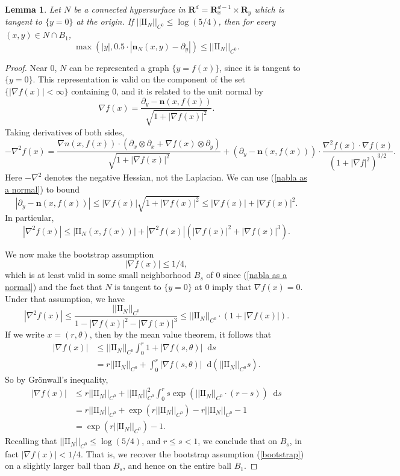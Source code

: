 \documentclass[reqno,11pt]{amsart}
\newcommand{\RR}{\mathbf{R}}
\newcommand*\dif{\mathop{}\!\mathrm{d}}
\newcommand{\Two}{\mathrm{I\!I}}
\newcommand{\normal}{\mathbf n}
\newtheorem{lemma}[theorem]{Lemma}
\theoremstyle{definition}
\numberwithin{equation}{section}
\begin{document}
\begin{lemma}\label{existence of tubes}
	Let $N$ be a connected hypersurface in $\RR^d = \RR^{d - 1}_x \times \RR_y$ which is tangent to $\{y = 0\}$ at the origin.
	If $||\Two_N||_{C^0} \leq \log(5/4)$, then for every $(x, y) \in N \cap B_1$,
	$$\max(|y|, 0.5 \cdot |\normal_N(x, y) - \partial_y|) \leq ||\Two_N||_{C^0}.$$
\end{lemma}
\begin{proof}
	Near $0$, $N$ can be represented a graph $\{y = f(x)\}$, since it is tangent to $\{y = 0\}$.
	This representation is valid on the component of the set $\{|\nabla f(x)| < \infty\}$ containing $0$, and it is related to the unit normal by
\begin{equation}\label{nabla as a normal}
	\nabla f(x) = \frac{\partial_y - \normal(x, f(x))}{\sqrt{1 + |\nabla f(x)|^2}}.
\end{equation}
	Taking derivatives of both sides,
	$$-\nabla^2 f(x) = \frac{\nabla n(x, f(x)) \cdot (\partial_x \otimes \partial_x + \nabla f(x) \otimes \partial_y)}{\sqrt{1 + |\nabla f(x)|^2}} + (\partial_y - \normal(x, f(x))) \cdot \frac{\nabla^2 f(x) \cdot \nabla f(x)}{(1 + |\nabla f|^2)^{3/2}}.$$
	Here $-\nabla^2$ denotes the negative Hessian, not the Laplacian.
	We can use (\ref{nabla as a normal}) to bound
	$$|\partial_y - \normal(x, f(x))| \leq |\nabla f(x)|\sqrt{1 + |\nabla f(x)|^2} \leq |\nabla f(x)| + |\nabla f(x)|^2.$$
	In particular,
	$$|\nabla^2 f(x)| \leq |\Two_N(x, f(x))| + |\nabla^2 f(x)| (|\nabla f(x)|^2 + |\nabla f(x)|^3).$$

	We now make the bootstrap assumption
\begin{equation}\label{bootstrap}
	|\nabla f(x)| \leq 1/4,
\end{equation}
	which is at least valid in some small neighborhood $B_s$ of $0$ since (\ref{nabla as a normal}) and the fact that $N$ is tangent to $\{y = 0\}$ at $0$ imply that $\nabla f(x) = 0$. Under that assumption, we have
	$$|\nabla^2 f(x)| \leq \frac{||\Two_N||_{C^0}}{1 - |\nabla f(x)|^2 - |\nabla f(x)|^3} \leq ||\Two_N||_{C^0} \cdot (1 + |\nabla f(x)|).$$
	If we write $x = (r, \theta)$, then by the mean value theorem, it follows that
\begin{align*}
	|\nabla f(x)| &\leq ||\Two_N||_{C^0} \int_0^r 1 + |\nabla f(s, \theta)| \dif s \\
	&= r||\Two_N||_{C^0} + \int_0^r |\nabla f(s, \theta)| \dif(||\Two_N||_{C^0} s).
\end{align*}
	So by Gr\"onwall's inequality,
\begin{align*}
	|\nabla f(x)| &\leq r ||\Two_N||_{C^0} + ||\Two_N||_{C^0}^2 \int_0^r s \exp(||\Two_N||_{C^0} \cdot (r - s)) \dif s \\
	&= r ||\Two_N||_{C^0} + \exp(r ||\Two_N||_{C^0}) - r ||\Two_N||_{C^0} - 1 \\
	&= \exp(r ||\Two_N||_{C^0}) - 1.
\end{align*}
	Recalling that $||\Two_N||_{C^0} \leq \log(5/4)$, and $r \leq s < 1$, we conclude that on $B_s$, in fact $|\nabla f(x)| < 1/4$.
	That is, we recover the bootstrap assumption (\ref{bootstrap}) on a slightly larger ball than $B_s$, and hence on the entire ball $B_1$.


\end{proof}
\end{document}
